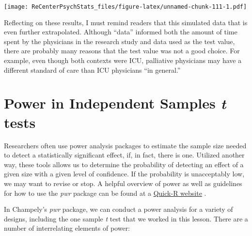 \documentclass[
  11pt,
]{book}
\newenvironment{Shaded}{\begin{snugshade}}{\end{snugshade}}
\newcommand{\AttributeTok}[1]{\textcolor[rgb]{0.77,0.63,0.00}{#1}}
\newcommand{\ConstantTok}[1]{\textcolor[rgb]{0.00,0.00,0.00}{#1}}
\newcommand{\FunctionTok}[1]{\textcolor[rgb]{0.00,0.00,0.00}{#1}}
\newcommand{\NormalTok}[1]{#1}
\newcommand{\SpecialCharTok}[1]{\textcolor[rgb]{0.00,0.00,0.00}{#1}}
\newcommand{\StringTok}[1]{\textcolor[rgb]{0.31,0.60,0.02}{#1}}
\begin{document}
\begin{Shaded}
\end{Shaded}

\texttt{[image: ReCenterPsychStats\_files/figure-latex/unnamed-chunk-111-1.pdf]}

Reflecting on these results, I must remind readers that this simulated data that is even further extrapolated. Although ``data'' informed both the amount of time spent by the physicians in the research study and data used as the test value, there are probably many reasons that the test value was not a good choice. For example, even though both contexts were ICU, palliative physicians may have a different standard of care than ICU physicians ``in general.''

\hypertarget{power-in-independent-samples-t-tests}{%
\section{\texorpdfstring{Power in Independent Samples \emph{t} tests}{Power in Independent Samples t tests}}\label{power-in-independent-samples-t-tests}}

Researchers often use power analysis packages to estimate the sample size needed to detect a statistically significant effect, if, in fact, there is one. Utilized another way, these tools allows us to determine the probability of detecting an effect of a given size with a given level of confidence. If the probability is unacceptably low, we may want to revise or stop. A helpful overview of power as well as guidelines for how to use the \emph{pwr} package can be found at a \href{https://www.statmethods.net/stats/power.html}{Quick-R website} \citep{kabacoff_power_2017}.

In Champely's \emph{pwr} package, we can conduct a power analysis for a variety of designs, including the one sample \emph{t} test that we worked in this lesson. There are a number of interrelating elements of power:
\end{document}
